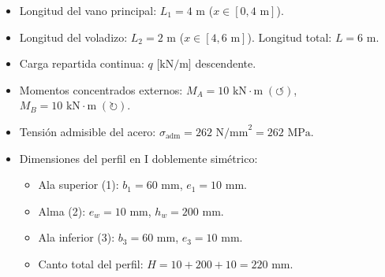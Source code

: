 \begin{tcolorbox}[colback=blue!5!white,colframe=blue!75!black,title=\textbf{Datos del Problema}]
    \begin{itemize}
        \item Longitud del vano principal: $L_1 = 4\text{ m}$ ($x \in [0, 4\text{ m}]$).
        \item Longitud del voladizo: $L_2 = 2\text{ m}$ ($x \in [4, 6\text{ m}]$). Longitud total: $L = 6\text{ m}$.
        \item Carga repartida continua: $q\text{ [kN/m]}$ descendente.
        \item Momentos concentrados externos: $M_A = 10\text{ kN}\cdot\text{m}\;(\circlearrowleft)$, $M_B = 10\text{ kN}\cdot\text{m}\;(\circlearrowright)$.
        \item Tensión admisible del acero: $\sigma_{\text{adm}} = 262\text{ N/mm}^2 = 262\text{ MPa}$.
        \item Dimensiones del perfil en I doblemente simétrico:
              \begin{itemize}
                  \item Ala superior (1): $b_1 = 60\text{ mm}$, $e_1 = 10\text{ mm}$.
                  \item Alma (2): $e_w = 10\text{ mm}$, $h_w = 200\text{ mm}$.
                  \item Ala inferior (3): $b_3 = 60\text{ mm}$, $e_3 = 10\text{ mm}$.
                  \item Canto total del perfil: $H = 10 + 200 + 10 = 220\text{ mm}$.
              \end{itemize}
    \end{itemize}
\end{tcolorbox}

